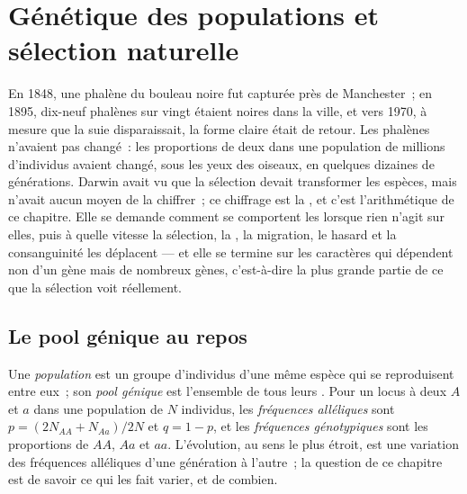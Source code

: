 \chapter{Génétique des populations et sélection naturelle}\label{ch:b2:population-genetics}

En 1848, une phalène du bouleau noire fut capturée près de Manchester~;
en 1895, dix-neuf phalènes sur vingt étaient noires dans la ville, et
vers 1970, à mesure que la suie disparaissait, la forme claire était de
retour. Les phalènes n'avaient pas changé~: les proportions de deux
 dans une population de millions d'individus avaient changé, sous
les yeux des oiseaux, en quelques dizaines de générations. Darwin avait
vu que la sélection devait transformer les espèces, mais n'avait aucun
moyen de la chiffrer~; ce chiffrage est la , et
c'est l'arithmétique de ce chapitre. Elle se demande comment se
comportent les  lorsque rien n'agit sur elles, puis
à quelle vitesse la sélection, la , la migration, le hasard et
la consanguinité les déplacent --- et elle se termine sur les caractères
qui dépendent non d'un gène mais de nombreux gènes, c'est-à-dire la
plus grande partie de ce que la sélection voit réellement.

\section{Le pool génique au repos}

\begin{definition}\label{def:b2:population-genetics:frequencies}
Une \emph{population} est un groupe d'individus d'une même espèce qui se
reproduisent entre eux~; son \emph{pool génique} est l'ensemble de tous
leurs . Pour un locus à deux  $A$ et $a$ dans une
population  de
$N$ individus, les \emph{fréquences alléliques} sont $p = (2N_{AA} +
N_{Aa})/2N$ et $q = 1 - p$, et les \emph{fréquences génotypiques} sont
les proportions de $AA$, $Aa$ et $aa$. L'évolution, au sens le plus
étroit, est une variation des fréquences alléliques d'une génération à
l'autre~; la question de ce chapitre est de savoir ce qui les fait varier,
et de combien.
\end{definition}

